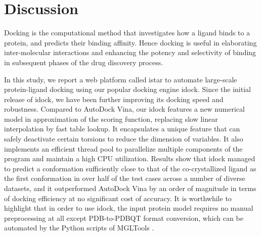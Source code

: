 \documentclass[10pt]{article}
\begin{document}

\section*{Discussion}
Docking is the computational method that investigates how a ligand binds to a protein, and predicts their binding affinity. Hence docking is useful in elaborating inter-molecular interactions and enhancing the potency and selectivity of binding in subsequent phases of the drug discovery process.

In this study, we report a web platform called istar to automate large-scale protein-ligand docking using our popular docking engine idock. Since the initial release of idock, we have been further improving its docking speed and robustness. Compared to AutoDock Vina, our idock features a new numerical model in approximation of the scoring function, replacing slow linear interpolation by fast table lookup. It encapsulates a unique feature that can safely deactivate certain torsions to reduce the dimension of variables. It also implements an efficient thread pool to parallelize multiple components of the program and maintain a high CPU utilization. Results show that idock managed to predict a conformation sufficiently close to that of the co-crystallized ligand as the first conformation in over half of the test cases across a number of diverse datasets, and it outperformed AutoDock Vina by an order of magnitude in terms of docking efficiency at no significant cost of accuracy. It is worthwhile to highlight that in order to use idock, the input protein model requires no manual preprocessing at all except PDB-to-PDBQT format conversion, which can be automated by the Python scripts of MGLTools \cite{596}.
\end{document}
